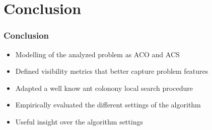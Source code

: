 \section{Conclusion}

\begin{frame} \frametitle{Conclusion} 

\begin{itemize}[<+->]
\item Modelling of the analyzed problem as ACO and ACS
\item Defined visibility metrics that better capture problem features
\item Adapted a well know ant colonony local search procedure
\item Empirically evaluated the different settings of the algorithm
\item Useful insight over the algorithm settings
\end{itemize}

\end{frame}